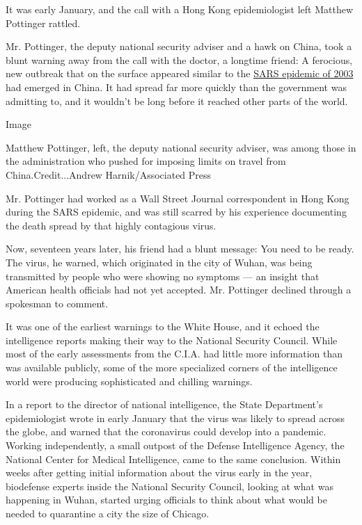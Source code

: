 It was early January, and the call with a Hong Kong epidemiologist left
Matthew Pottinger rattled.

Mr. Pottinger, the deputy national security adviser and a hawk on China,
took a blunt warning away from the call with the doctor, a longtime
friend: A ferocious, new outbreak that on the surface appeared similar
to the
\href{https://www.nytimes.com/2003/04/27/world/the-sars-epidemic-the-path-from-china-s-provinces-a-crafty-germ-breaks-out.html}{SARS
epidemic of 2003} had emerged in China. It had spread far more quickly
than the government was admitting to, and it wouldn't be long before it
reached other parts of the world.

Image

Matthew Pottinger, left, the deputy national security adviser, was among
those in the administration who pushed for imposing limits on travel
from China.Credit...Andrew Harnik/Associated Press

Mr. Pottinger had worked as a Wall Street Journal correspondent in Hong
Kong during the SARS epidemic, and was still scarred by his experience
documenting the death spread by that highly contagious virus.

Now, seventeen years later, his friend had a blunt message: You need to
be ready. The virus, he warned, which originated in the city of Wuhan,
was being transmitted by people who were showing no symptoms --- an
insight that American health officials had not yet accepted. Mr.
Pottinger declined through a spokesman to comment.

It was one of the earliest warnings to the White House, and it echoed
the intelligence reports making their way to the National Security
Council. While most of the early assessments from the C.I.A. had little
more information than was available publicly, some of the more
specialized corners of the intelligence world were producing
sophisticated and chilling warnings.

In a report to the director of national intelligence, the State
Department's epidemiologist wrote in early January that the virus was
likely to spread across the globe, and warned that the coronavirus could
develop into a pandemic. Working independently, a small outpost of the
Defense Intelligence Agency, the National Center for Medical
Intelligence, came to the same conclusion. Within weeks after getting
initial information about the virus early in the year, biodefense
experts inside the National Security Council, looking at what was
happening in Wuhan, started urging officials to think about what would
be needed to quarantine a city the size of Chicago.


